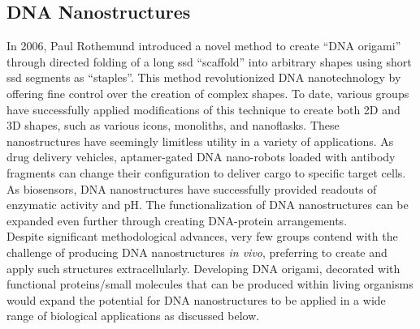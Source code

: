 \documentclass[a4paper]{article}
\begin{document}
\subsection*{DNA Nanostructures}
In 2006, Paul Rothemund introduced a novel method to create “DNA origami” through directed folding of a long \ac{ssd} “scaffold” into arbitrary shapes using short \ac{ssd} segments as “staples”\cite{intro1}.
This method revolutionized DNA nanotechnology by offering fine control over the creation of complex shapes.
To date, various  groups have successfully applied modifications of this technique to create both 2D and 3D shapes, such as various icons, monoliths, and nanoflasks\cite{intro1,intro2,intro3,intro4}.
These nanostructures have seemingly limitless utility in a variety of applications.
As drug delivery vehicles, aptamer-gated DNA nano-robots loaded with antibody fragments can change their configuration to deliver cargo to specific target cells\cite{intro5}.
As biosensors, DNA nanostructures have successfully provided readouts of enzymatic activity and pH\cite{intro6,intro7}.
The functionalization of DNA nanostructures can be expanded even further through creating DNA-protein arrangements.
\vspace{2 mm}
\\
Despite significant methodological advances, very few groups contend with the challenge of producing DNA nanostructures \textit{in vivo}, preferring to create and apply such structures extracellularly.
Developing DNA origami, decorated with functional proteins/small molecules that can be produced within living organisms would expand the potential for DNA nanostructures to be applied in a wide range of biological applications as discussed below.
\end{document}

